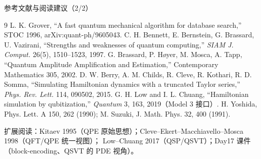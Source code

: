 \documentclass[aspectratio=169,10pt]{ctexbeamer}
\begin{document}
\begin{frame}{参考文献与阅读建议（2/2）}
\scriptsize
\begin{thebibliography}{9}
 L. K. Grover, ``A fast quantum mechanical algorithm for database search,'' STOC 1996, arXiv:quant-ph/9605043.
 C. H. Bennett, E. Bernstein, G. Brassard, U. Vazirani, ``Strengths and weaknesses of quantum computing,'' \emph{SIAM J. Comput.} 26(5), 1510--1523, 1997.
 G. Brassard, P. H{\o}yer, M. Mosca, A. Tapp, ``Quantum Amplitude Amplification and Estimation,'' Contemporary Mathematics 305, 2002.
 D. W. Berry, A. M. Childs, R. Cleve, R. Kothari, R. D. Somma, ``Simulating Hamiltonian dynamics with a truncated Taylor series,'' \emph{Phys. Rev. Lett.} 114, 090502, 2015.
 G. H. Low and I. L. Chuang, ``Hamiltonian simulation by qubitization,'' \emph{Quantum} 3, 163, 2019（Model 3 接口）.
 H. Yoshida, Phys. Lett. A 150, 262 (1990); M. Suzuki, J. Math. Phys. 32, 400 (1991).
\end{thebibliography}
\vspace{1mm}
{\tiny\color{graytext}扩展阅读：Kitaev 1995（QPE 原始思想）；Cleve--Ekert--Macchiavello--Mosca 1998（QFT/QPE 统一视图）；
Low--Chuang 2017（QSP/QSVT）；Day17 课件（block-encoding、QSVT 的 PDE 视角）。}
\end{frame}
\end{document}

